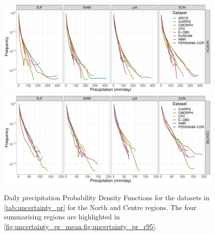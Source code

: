 \afterpage{\clearpage}
\begin{figure}
    \centering
        \includegraphics[width=0.8\textheight]{figures/uncertainty/pdf_NORTH_lines}
        \includegraphics[width=0.8\textheight]{figures/uncertainty/pdf_CENTRE_lines}
    \caption[Precipitation distribution (PDFs): uncertainty over Italy (1)]{
        Daily precipitation Probability Density Functions for the datasets in \cref{tab:uncertainty_pr} for the North and Centre regions. The four summarising regions are highlighted in \cref{fig:uncertainty_pr_mean,fig:uncertainty_pr_r95}.
    }\label{fig:uncertainty_pr_pdf1}
\end{figure}
